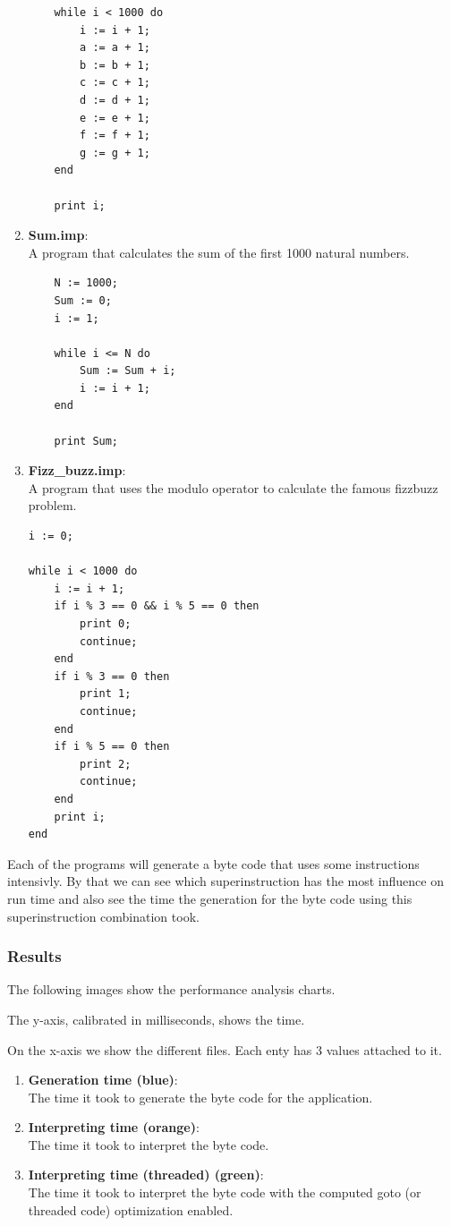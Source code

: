 \documentclass{article}
\begin{document}
\begin{enumerate}
\begin{verbatim}
    while i < 1000 do
        i := i + 1;
        a := a + 1;
        b := b + 1;
        c := c + 1;
        d := d + 1;
        e := e + 1;
        f := f + 1;
        g := g + 1;
    end

    print i;
\end{verbatim}

    \item \textbf{Sum.imp}:\\
    \label{item:inc_loop}
    A program that calculates the sum of the first 1000 natural numbers.
\begin{verbatim}
    N := 1000;
    Sum := 0;
    i := 1;

    while i <= N do
        Sum := Sum + i;
        i := i + 1;
    end

    print Sum;
\end{verbatim}
    \item \textbf{Fizz\_buzz.imp}:\\
    A program that uses the modulo operator to calculate the famous fizzbuzz problem.
\begin{verbatim}
i := 0;

while i < 1000 do
    i := i + 1;
    if i % 3 == 0 && i % 5 == 0 then
        print 0;
        continue;
    end
    if i % 3 == 0 then
        print 1;
        continue;
    end
    if i % 5 == 0 then
        print 2;
        continue;
    end
    print i;
end
\end{verbatim}
\end{enumerate}

Each of the programs will generate a byte code that uses some instructions
intensivly. By that we can see which superinstruction has the most influence on
run time and also see the time the generation for the byte code using this
superinstruction combination took.

\subsubsection{Results}
The following images show the performance analysis charts.

The y-axis, calibrated in milliseconds, shows the time.

On the x-axis we show the different files. Each enty has 3 values attached to it.

\begin{enumerate}
    \item \textbf{Generation time (blue)}:\\
        The time it took to generate the byte code for the application.
    \item \textbf{Interpreting time (orange)}:\\
        The time it took to interpret the byte code.
    \item \textbf{Interpreting time (threaded) (green)}:\\
        The time it took to interpret the byte code with the computed goto (or
        threaded code) optimization enabled.
\end{enumerate}
\end{document}
